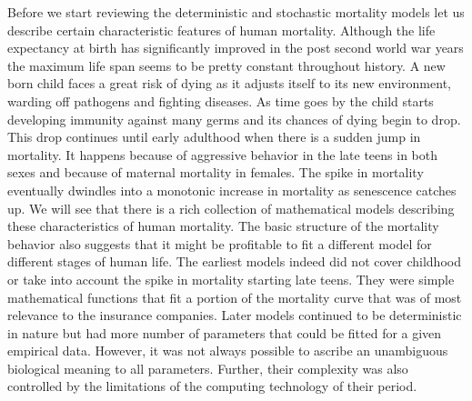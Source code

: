 \documentclass{article}
\numberwithin{equation}{section}
\begin{document}
Before we start reviewing the deterministic and stochastic mortality models
let us describe certain characteristic features of human mortality. Although
the life expectancy at birth has significantly improved in the post second
world war years the maximum life span seems to be pretty constant throughout 
history. A new born child faces a great risk of dying as it adjusts itself
to its new environment, warding off pathogens and fighting diseases. As time 
goes by the child starts developing immunity against many germs and its
chances of dying begin to drop. This drop continues until early adulthood 
when there is a sudden jump in mortality. It happens because of aggressive
behavior in the late teens in both sexes and because of maternal mortality
in females. The spike in mortality eventually dwindles into a monotonic
increase in mortality as senescence catches up. We will see that there is 
a rich collection of mathematical models describing these characteristics
of human mortality. The basic structure of the mortality behavior also
suggests that it might be profitable to fit a different model for different
stages of human life. The earliest models indeed did not cover childhood or
take into account the spike in mortality starting late teens. They were 
simple mathematical functions that fit a portion of the mortality curve that
was of most relevance to the insurance companies. Later models continued to
be deterministic in nature but had more number of parameters that could be
fitted for a given empirical data. However, it was not always possible to 
ascribe an unambiguous biological meaning to all parameters. Further, their
complexity was also controlled by the limitations of the computing technology
of their period.
\end{document}
